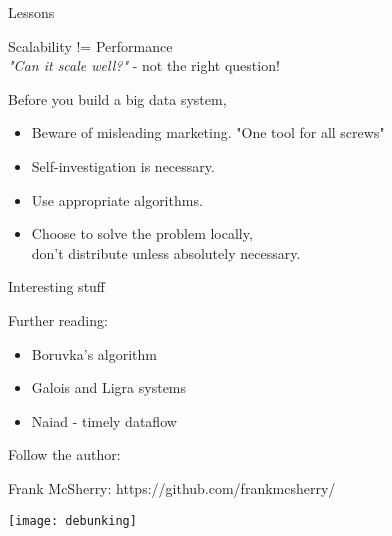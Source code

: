 \begin{frame}[t]{Lessons}

  \pause

  \begin{center}
    \large{Scalability != Performance}\\
    \vspace{0.1cm}
    \textit{"Can it scale well?"} - not the right question!
  \end{center}
  
  \vspace{0.5cm}
  \pause
  
  Before you build a big data system,
  \vspace{0.1cm}
  \begin{itemize}
    \item Beware of misleading marketing. "One tool for all screws"
    \item Self-investigation is necessary.
    \item Use appropriate algorithms.
    \item Choose to solve the problem locally,\\ don't distribute unless absolutely necessary.
  \end{itemize}

\end{frame}

\begin{frame}[t]{Interesting stuff}

  \vspace{0.25cm}

  Further reading:
  \vspace{0.25cm}
  \begin{itemize}
    \item Boruvka’s algorithm
    \item Galois and Ligra systems
    \item Naiad - timely dataflow
  \end{itemize}

  \vspace{0.5cm}

  Follow the author:
  \vspace{0.25cm}

  Frank McSherry: https://github.com/frankmcsherry/

  \vspace{0.25cm}

  \begin{center}
    \texttt{[image: debunking]}
  \end{center}

\end{frame}

